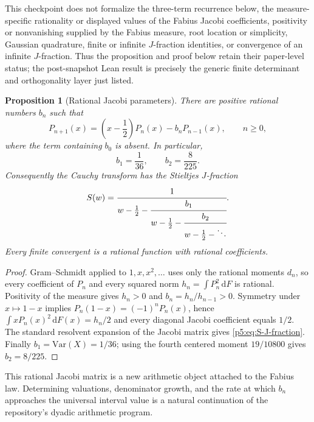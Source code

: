 \documentclass[11pt,oneside]{article}
\newtheorem{proposition}[theorem]{Proposition}
\theoremstyle{definition}
\theoremstyle{remark}
\newcommand{\dd}{\,\mathrm d}
\newcommand{\1}{\mathbf 1}
\begin{document}
\begin{statusbox}
This checkpoint does not formalize the three-term recurrence below, the
measure-specific rationality or displayed values of the Fabius Jacobi coefficients,
positivity or nonvanishing supplied by the Fabius measure, root location or simplicity,
Gaussian quadrature, finite or infinite $J$-fraction identities, or convergence of an
infinite $J$-fraction.  Thus the proposition and proof below retain their paper-level
status; the post-snapshot Lean result is precisely the generic finite determinant and
orthogonality layer just listed.
\end{statusbox}

\begin{proposition}[Rational Jacobi parameters]\label{p5:prop:rational-Jacobi}
There are positive rational numbers $b_n$ such that
\begin{equation}\label{p5:eq:orthogonal-recurrence}
 P_{n+1}(x)=\left(x-\frac12\right)P_n(x)-b_nP_{n-1}(x),
 \qquad n\ge0,
\end{equation}
where the term containing $b_0$ is absent.  In particular,
\begin{equation}\label{p5:eq:first-Jacobi}
 b_1=\frac1{36},
 \qquad b_2=\frac8{225}.
\end{equation}
Consequently the Cauchy transform has the Stieltjes $J$-fraction
\begin{equation}\label{p5:eq:S-J-fraction}
 S(w)=\cfrac{1}{w-\frac12-
 \cfrac{b_1}{w-\frac12-
 \cfrac{b_2}{w-\frac12-\ddots}}}.
\end{equation}
Every finite convergent is a rational function with rational coefficients.
\end{proposition}

\begin{proof}
Gram--Schmidt applied to $1,x,x^2,\ldots$ uses only the rational moments $d_n$, so every coefficient of $P_n$ and every squared norm
$h_n=\int P_n^2\dd F$ is rational.  Positivity of the measure gives $h_n>0$ and $b_n=h_n/h_{n-1}>0$.  Symmetry under $x\mapsto1-x$ implies
$P_n(1-x)=(-1)^nP_n(x)$, hence
$\int xP_n(x)^2\dd F(x)=h_n/2$ and every diagonal Jacobi coefficient equals $1/2$.  The standard resolvent expansion of the Jacobi matrix gives \eqref{p5:eq:S-J-fraction}.  Finally \(b_1=\mathrm{Var}(X)=1/36\); using the fourth centered moment $19/10800$ gives $b_2=8/225$.
\end{proof}

This rational Jacobi matrix is a new arithmetic object attached to the Fabius law.  Determining valuations, denominator growth, and the rate at which $b_n$ approaches the universal interval value is a natural continuation of the repository's dyadic arithmetic program.
\end{document}
